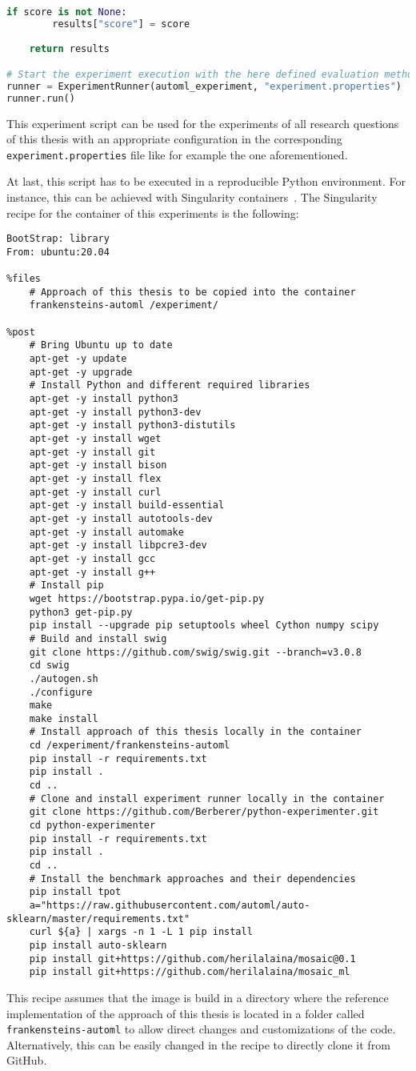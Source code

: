 \begin{lstlisting}[language=Python,basicstyle=\scriptsize]
    if score is not None:
        results["score"] = score

    return results

# Start the experiment execution with the here defined evaluation method
runner = ExperimentRunner(automl_experiment, "experiment.properties")
runner.run()
\end{lstlisting}
This experiment script can be used for the experiments of all research questions of this thesis with an appropriate configuration in the corresponding \texttt{experiment.properties} file like for example the one aforementioned.

At last, this script has to be executed in a reproducible Python environment.
For instance, this can be achieved with Singularity containers~\cite{Kurtzer-Singularity}.
The Singularity recipe for the container of this experiments is the following:
\begin{Verbatim}[fontsize=\scriptsize]
BootStrap: library
From: ubuntu:20.04

%files
    # Approach of this thesis to be copied into the container
    frankensteins-automl /experiment/

%post
    # Bring Ubuntu up to date
    apt-get -y update
    apt-get -y upgrade
    # Install Python and different required libraries
    apt-get -y install python3
    apt-get -y install python3-dev
    apt-get -y install python3-distutils
    apt-get -y install wget
    apt-get -y install git
    apt-get -y install bison
    apt-get -y install flex
    apt-get -y install curl
    apt-get -y install build-essential
    apt-get -y install autotools-dev
    apt-get -y install automake
    apt-get -y install libpcre3-dev
    apt-get -y install gcc
    apt-get -y install g++
    # Install pip
    wget https://bootstrap.pypa.io/get-pip.py
    python3 get-pip.py
    pip install --upgrade pip setuptools wheel Cython numpy scipy
    # Build and install swig
    git clone https://github.com/swig/swig.git --branch=v3.0.8
    cd swig
    ./autogen.sh
    ./configure
    make
    make install
    # Install approach of this thesis locally in the container
    cd /experiment/frankensteins-automl
    pip install -r requirements.txt
    pip install .
    cd ..
    # Clone and install experiment runner locally in the container
    git clone https://github.com/Berberer/python-experimenter.git
    cd python-experimenter
    pip install -r requirements.txt
    pip install .
    cd ..
    # Install the benchmark approaches and their dependencies
    pip install tpot
    a="https://raw.githubusercontent.com/automl/auto-sklearn/master/requirements.txt"
    curl ${a} | xargs -n 1 -L 1 pip install
    pip install auto-sklearn
    pip install git+https://github.com/herilalaina/mosaic@0.1
    pip install git+https://github.com/herilalaina/mosaic_ml
\end{Verbatim}
This recipe assumes that the image is build in a directory where the reference implementation of the approach of this thesis is located in a folder called \texttt{frankensteins-automl} to allow direct changes and customizations of the code.
Alternatively, this can be easily changed in the recipe to directly clone it from GitHub.

